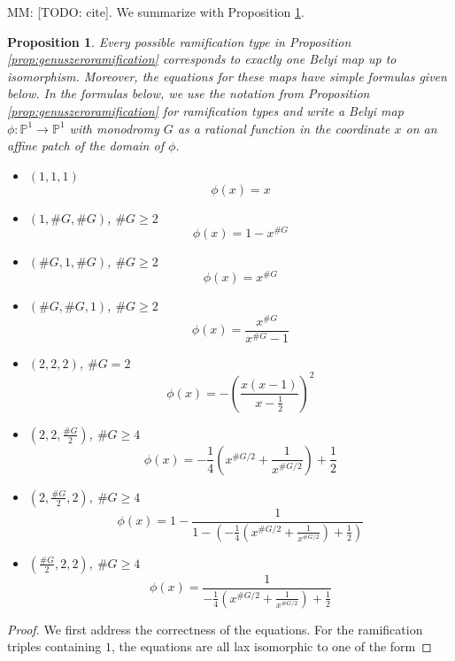 \documentclass{dcthesis}
\newcommand{\PP}{\mathbb P}
\newcommand{\mm}[1]{{\color{blue} \sf MM: [#1]}}
\newtheorem{prop}{Proposition}[section]
\theoremstyle{definition}
\theoremstyle{remark}
\numberwithin{equation}{section}
\numberwithin{figure}{section}
\begin{document}
{{    \mm{TODO: cite}\cite{turkishbelyithesis}.
    We summarize with Proposition \ref{prop:turkishbelyithesis}.
    \begin{prop}\label{prop:turkishbelyithesis}
      Every possible ramification type in
      Proposition \ref{prop:genuszeroramification}
      corresponds to exactly one Belyi map up to isomorphism.
      Moreover, the equations for these maps have simple formulas
      given below.
      In the formulas below,
      we use the notation from Proposition \ref{prop:genuszeroramification}
      for ramification types and write a Belyi map
      $\phi:\PP^1\to\PP^1$ with monodromy $G$
      as a rational function in the coordinate $x$
      on an affine patch of the domain of $\phi$.
      \begin{itemize}
        \item
          $(1,1,1)$
          \[
            \phi(x) = x
          \]
        \item
          $(1,\#G, \#G)$, $\#G\ge 2$
          \[
            \phi(x) = 1-x^{\#G}
          \]
        \item
          $(\#G, 1, \#G)$, $\#G\ge 2$
          \[
            \phi(x) = x^{\#G}
          \]
        \item
          $(\#G, \#G, 1)$, $\#G\ge 2$
          \[
            \phi(x) = \frac{x^{\#G}}{x^{\#G}-1}
          \]
        \item
          $(2, 2, 2)$, $\#G = 2$
          \[
            \phi(x) = -\left(\frac{x(x-1)}{x-\frac{1}{2}}\right)^2
          \]
        \item
          $(2, 2, \frac{\#G}{2})$, $\#G\ge 4$
          \[
            \phi(x) = -\frac{1}{4}\left(x^{\#G/2}+\frac{1}{x^{\#G/2}}\right)
            +\frac{1}{2}
          \]
        \item
          $(2, \frac{\#G}{2}, 2)$, $\#G\ge 4$
          \[
            \phi(x) = 1-\frac{1}{1-\left(-\frac{1}{4}\left(x^{\#G/2}+\frac{1}{x^{\#G/2}}\right)
            +\frac{1}{2}\right)}
          \]
        \item
          $(\frac{\#G}{2}, 2, 2)$, $\#G\ge 4$
          \[
            \phi(x) = \frac{1}{-\frac{1}{4}\left(x^{\#G/2}+\frac{1}{x^{\#G/2}}\right)
            +\frac{1}{2}}
          \]
      \end{itemize}
    \end{prop}
    \begin{proof}
      We first address the correctness of the equations.
      For the ramification triples containing $1$,
      the equations are all lax isomorphic to one of the form

\end{proof}}}
\end{document}
